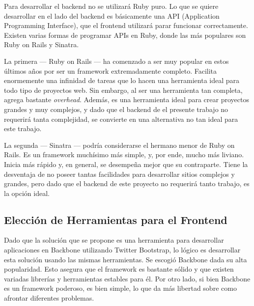 \documentclass[12pt,titlepage,]{article}
\begin{document}
Para desarrollar el backend no se utilizará Ruby puro. Lo que se quiere
desarrollar en el lado del backend es básicamente una API (Application
Programming Interface), que el frontend utilizará parar funcionar
correctamente. Existen varias formas de programar APIs en Ruby, donde
las más populares son Ruby on Rails y Sinatra.

La primera --- Ruby on Rails --- ha comenzado a ser muy popular en estos
últimos años por ser un framework extremadamente completo. Facilita
enormemente una infinidad de tareas que lo hacen una herramienta ideal
para todo tipo de proyectos web. Sin embargo, al ser una herramienta tan
completa, agrega bastante \emph{overhead}. Además, es una herramienta
ideal para crear proyectos grandes y muy complejos, y dado que el
backend de el presente trabajo no requerirá tanta complejidad, se
convierte en una alternativa no tan ideal para este trabajo.

La segunda --- Sinatra --- podría considerarse el hermano menor de Ruby
on Rails. Es un framework muchísimo más simple, y, por ende, mucho más
liviano. Inicia más rápido y, en general, se desempeña mejor que su
contraparte. Tiene la desventaja de no poseer tantas facilidades para
desarrollar sitios complejos y grandes, pero dado que el backend de este
proyecto no requerirá tanto trabajo, es la opción ideal.

\subsection{Elección de Herramientas para el Frontend}

Dado que la solución que se propone es una herramienta para desarrollar
aplicaciones en Backbone utilizando Twitter Bootstrap, lo lógico es
desarrollar esta solución usando las mismas herramientas. Se escogió
Backbone dada su alta popularidad. Esto asegura que el framework es
bastante sólido y que existen variadas librerías y herramientas estables
para él. Por otro lado, si bien Backbone es un framework poderoso, es
bien simple, lo que da más libertad sobre como afrontar diferentes
problemas.
\end{document}
